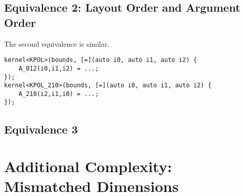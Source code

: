 \documentclass{article}
\begin{document}
\subsection{Equivalence 2: Layout Order and Argument Order}

The second equivalence is similar.
\begin{lstlisting}
kernel<KPOL>(bounds, [=](auto i0, auto i1, auto i2) {
    A_012(i0,i1,i2) = ...;
});
kernel<KPOL_210>(bounds, [=](auto i0, auto i1, auto i2) {
    A_210(i2,i1,i0) = ...;
});
\end{lstlisting}



\subsection{Equivalence 3}


\section{Additional Complexity: Mismatched Dimensions}
\end{document}
